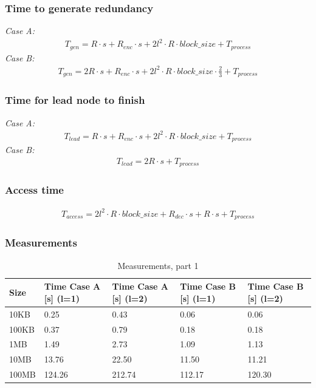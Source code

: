 \subsubsection*{Time to generate redundancy}
\textit{Case A:} 
\begin{align}
    T_{gen} = R \cdot s + R_{enc} \cdot s + 2l^{2} \cdot R \cdot block\_size + T_{process}
\end{align}
\textit{Case B:} 
\begin{align}
    T_{gen} = 2R \cdot s + R_{enc} \cdot s + 2l^{2} \cdot R \cdot block\_size \cdot \frac{2}{3} + T_{process}
\end{align}

\subsubsection*{Time for lead node to finish}
\textit{Case A:} 
\begin{align}
    T_{lead} = R \cdot s + R_{enc} \cdot s + 2l^{2} \cdot R \cdot block\_size + T_{process}
\end{align}
\textit{Case B:} 
\begin{align}
    T_{lead} = 2R \cdot s + T_{process}
\end{align}

\subsubsection*{Access time}
\begin{align}
    T_{access} = 2l^{2} \cdot R \cdot block\_size + R_{dec} \cdot s + R \cdot s + T_{process}
\end{align}

\subsubsection*{Measurements}
\begin{table}[H]
    \begin{tabularx}{\textwidth}{|X|X|X|X|X|}
        \hline
        \cellcolor{lightgray}\textbf{Size} & \cellcolor{lightgray}\textbf{Time Case A [s] (l=1)} & \cellcolor{lightgray}\textbf{Time Case A [s] (l=2)} & \cellcolor{lightgray}\textbf{Time Case B [s] (l=1)} & \cellcolor{lightgray}\textbf{Time Case B [s] (l=2)} \\\hline
        10KB  & 0.25   & 0.43   & 0.06   & 0.06   \\\hline
        100KB & 0.37   & 0.79   & 0.18   & 0.18   \\\hline
        1MB   & 1.49   & 2.73   & 1.09   & 1.13   \\\hline
        10MB  & 13.76  & 22.50  & 11.50  & 11.21  \\\hline
        100MB & 124.26 & 212.74 & 112.17 & 120.30 \\\hline
    \end{tabularx}
    \caption{Measurements, part 1}
	\label{tab:e3meas1}
\end{table}

